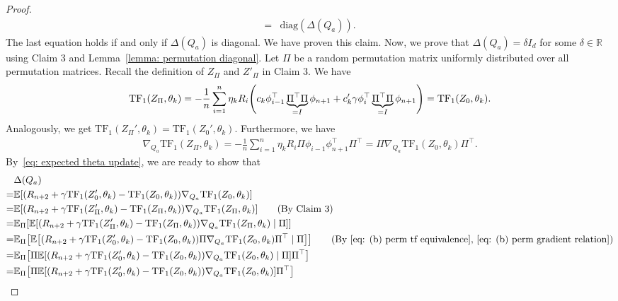 \documentclass{article}
\newcommand{\explain}[1]{\tag*{(#1)}}
\newcommand{\R}{\mathbb{R}}
\newcommand{\E}{\mathbb{E}}
\newcommand{\tf}{\text{TF}}
\newcommand{\diag}{\text{diag}}
\begin{document}
\begin{proof}
\begin{align}
    =& \diag(\Delta(Q_a)) \label{eq: delta Q diag}.
\end{align}
The last equation holds if and only if $\Delta(Q_a)$ is diagonal.
We have proven this claim.
Now, we prove that $\Delta(Q_a) = \delta I_d$ for some $\delta \in \R$ using Claim 3 and Lemma~\ref{lemma: permutation diagonal}.
Let $\Pi$ be a random permutation matrix uniformly distributed over all permutation matrices.
Recall the definition of $Z_\Pi$ and $Z'_\Pi$ in Claim 3.
We have
\begin{align}
\label{eq: (b) perm tf equivalence}
    \tf_1(Z_\Pi,\theta_k) = -\frac{1}{n}\sum_{i=1}^n  \eta_k R_i \qty(c_k \phi_{i-1}^\top \underbrace{\Pi^\top \Pi}_{= I} \phi_{n+1} + c'_k \gamma \phi_i^\top \underbrace{\Pi^\top \Pi}_{= I} \phi_{n+1})
    = \tf_1(Z_0,\theta_k).
\end{align}
Analogously, we get $\tf_1(Z_\Pi', \theta_k) = \tf_1(Z_0', \theta_k)$.
Furthermore, we have
\begin{align}
\label{eq: (b) perm gradient relation}
    \nabla_{Q_a} \tf_1(Z_\Pi, \theta_k) = -\frac{1}{n}\sum_{i=1}^n \eta_k R_i  \Pi \phi_{i-1} \phi_{n+1}^\top \Pi^\top
    = \Pi \nabla_{Q_a} \tf_1(Z_0, \theta_k) \Pi^\top.
\end{align}
By~\eqref{eq: expected theta update}, we are ready to show that
\begin{align}
    & \Delta(Q_a)\\
    =& \E\qty[(R_{n+2} + \gamma \tf_1(Z'_0, \theta_k) - \tf_1(Z_0, \theta_k))\nabla_{Q_a}\tf_1(Z_0, \theta_k)]\\
    =& \E\qty[(R_{n+2} + \gamma \tf_1(Z'_\Pi, \theta_k) - \tf_1(Z_\Pi, \theta_k))\nabla_{Q_a}\tf_1(Z_\Pi, \theta_k)]\explain{By Claim 3}\\
    =& \E_{\Pi} \qty[\E\qty[(R_{n+2} + \gamma \tf_1(Z'_\Pi, \theta_k) - \tf_1(Z_\Pi, \theta_k))\nabla_{Q_a}\tf_1(Z_\Pi, \theta_k) \mid \Pi]]\\
    =& \E_{\Pi} \qty[\E\qty[(R_{n+2} + \gamma \tf_1(Z'_0, \theta_k) - \tf_1(Z_0, \theta_k))\Pi \nabla_{Q_a}\tf_1(Z_0, \theta_k) \Pi^\top\mid \Pi]]\explain{By \eqref{eq: (b) perm tf equivalence}, \eqref{eq: (b) perm gradient relation}}\\
    =& \E_{\Pi} \qty[\Pi \E\qty[(R_{n+2} + \gamma \tf_1(Z'_0, \theta_k) - \tf_1(Z_0, \theta_k))\nabla_{Q_a}\tf_1(Z_0, \theta_k) \mid \Pi]\Pi^\top]\\
    =& \E_{\Pi} \qty[\Pi \E\qty[(R_{n+2} + \gamma \tf_1(Z'_0, \theta_k) - \tf_1(Z_0, \theta_k))\nabla_{Q_a}\tf_1(Z_0, \theta_k)]\Pi^\top]\\

\end{align}
\end{proof}
\end{document}
